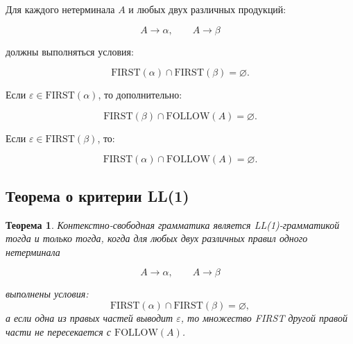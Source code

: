 \documentclass[12pt,a4paper]{article}
\newtheorem{theorem}{Теорема}
\begin{document}
Для каждого нетерминала $A$ и любых двух различных продукций:

\[
A \to \alpha,
\qquad
A \to \beta
\]

должны выполняться условия:

\[
\mathrm{FIRST}(\alpha)\cap \mathrm{FIRST}(\beta)=\varnothing.
\]

Если $\varepsilon \in \mathrm{FIRST}(\alpha)$, то дополнительно:

\[
\mathrm{FIRST}(\beta)\cap \mathrm{FOLLOW}(A)=\varnothing.
\]

Если $\varepsilon \in \mathrm{FIRST}(\beta)$, то:

\[
\mathrm{FIRST}(\alpha)\cap \mathrm{FOLLOW}(A)=\varnothing.
\]

\subsection{Теорема о критерии LL(1)}

\begin{theorem}
Контекстно-свободная грамматика является LL(1)-грамматикой тогда и только тогда, когда для любых двух различных правил одного нетерминала

\[
A \to \alpha,
\qquad
A \to \beta
\]

выполнены условия:
\[
\mathrm{FIRST}(\alpha)\cap \mathrm{FIRST}(\beta)=\varnothing,
\]
а если одна из правых частей выводит $\varepsilon$, то множество FIRST другой правой части не пересекается с $\mathrm{FOLLOW}(A)$.
\end{theorem}
\end{document}
